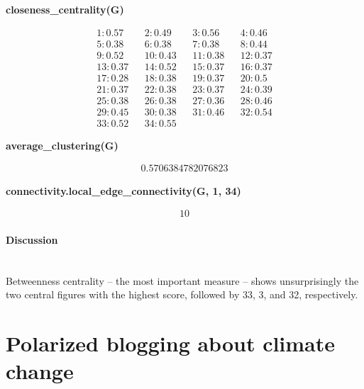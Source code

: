 \documentclass[11pt]{article}
\begin{document}
\textbf{closeness\_centrality(G)}

\begin{align*}
1: 0.57 &&  2: 0.49 && 3: 0.56 && 4: 0.46 \\
5: 0.38 && 6: 0.38 && 7: 0.38 && 8: 0.44 \\
9: 0.52 && 10: 0.43 && 11: 0.38 && 12: 0.37 \\
13: 0.37 && 14: 0.52 && 15: 0.37 && 16: 0.37 \\
17: 0.28 && 18: 0.38 && 19: 0.37 && 20: 0.5 \\
21: 0.37 && 22: 0.38 && 23: 0.37 && 24: 0.39 \\
25: 0.38 && 26: 0.38 && 27: 0.36 && 28: 0.46 \\
29: 0.45 && 30: 0.38 && 31: 0.46 && 32: 0.54 \\
33: 0.52 && 34: 0.55 && &&
\end{align*}

\textbf{average\_clustering(G)}

\begin{align*}0.5706384782076823\end{align*}

\textbf{connectivity.local\_edge\_connectivity(G, 1, 34)}

\begin{align*}10\end{align*}

\paragraph{Discussion} \hspace{0pt} \\
Betweenness centrality -- the most important measure -- shows unsurprisingly the two
central figures with the highest score, followed by 33, 3, and 32, respectively.

\section{Polarized blogging about climate change}
\end{document}
